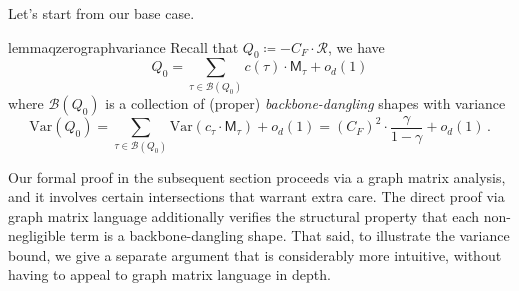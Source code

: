 \documentclass[12pt]{article}
\def \E {\mathbb{E}}
\newcommand{\Var}{\mathrm{Var}}
\def\1{\bm{1}}
\newcommand{\calB}{\mathcal{B}}
\newcommand{\calR}{\mathcal{R}}
\newcommand{\gam}{\gamma}
\newcommand{\cm}{\mathsf{M} }
\newcommand{\calL}{\mathcal{L}}
\newcommand{\Authornote}[3]{{\sf\footnotesize\color{#3}{[#1: #2]}}}
\newcommand{\Authornote}[3]{}
\newcommand{\snote}[1]{\Authornote{Sofia}{#1}{orange}}
\begin{document}
 Let's start from our base case.  %
 \begin{restatable}{lemma}{qzerographvariance}
\label{lem:q0-graph-variance} Recall that $Q_0 \coloneqq -C_F \cdot \calR$,
  	we have 
  	\[ Q_0 = \sum_{\tau \in\calB(Q_0)} c(\tau) \cdot \cm_\tau + o_d(1) \]
  	where $\calB(Q_0)$ is a collection of (proper) \emph{backbone-dangling} shapes with variance
  	\[ 
  \Var(Q_0) = \sum_{\tau\in\calB(Q_0)} \Var(c_{\tau} \cdot \cm_{\tau}) +o_d(1)= (C_F)^2 \cdot \frac{\gam }{1-\gam } +o_d(1)\,.
  \]
\end{restatable} 
%
Our formal proof in the subsequent section proceeds via a graph matrix analysis, and it involves certain intersections that warrant extra care. The direct proof via graph matrix language additionally verifies the structural property that each non-negligible term is a backbone-dangling shape. That said, to illustrate the variance bound, we give a separate argument that is considerably more intuitive, without having to appeal to graph matrix language in depth.
%
%
\end{document}
